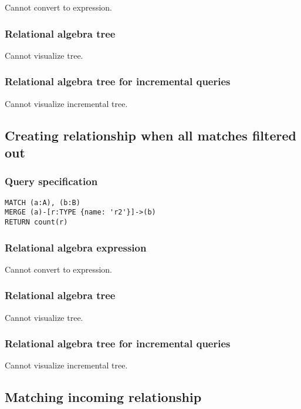 Cannot convert to expression.

\subsubsection*{Relational algebra tree}

Cannot visualize tree.

\subsubsection*{Relational algebra tree for incremental queries}

Cannot visualize incremental tree.

\subsection{Creating relationship when all matches filtered out}

\subsubsection*{Query specification}

\begin{lstlisting}
MATCH (a:A), (b:B)
MERGE (a)-[r:TYPE {name: 'r2'}]->(b)
RETURN count(r)
\end{lstlisting}

\subsubsection*{Relational algebra expression}

Cannot convert to expression.

\subsubsection*{Relational algebra tree}

Cannot visualize tree.

\subsubsection*{Relational algebra tree for incremental queries}

Cannot visualize incremental tree.

\subsection{Matching incoming relationship}

